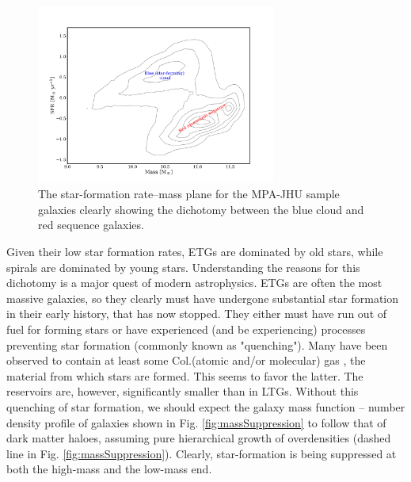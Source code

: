 	\begin{figure}
		\centering
		\includegraphics[width=0.7\textwidth]{introduction/sfMass.png}
		\caption[Star-formation rate--galaxy mass diagram]{The star-formation rate--mass plane for the MPA-JHU sample galaxies \citep{Kauffmann2003, Brinchmann2003, Salim2007} clearly showing the dichotomy between the blue cloud and red sequence galaxies.}
		\label{fig:colourMass}
	\end{figure}

	Given their low star formation rates, ETGs are dominated by old stars, while spirals are dominated by young stars. Understanding the reasons for this dichotomy is a major quest of modern astrophysics. ETGs are often the most massive galaxies, so they clearly must have undergone substantial star formation in their early history, that has now stopped. They either must have run out of fuel for forming stars or have experienced (and be experiencing) processes preventing star formation (commonly known as "quenching"). Many have been observed to contain at least some Col.(atomic and/or molecular) gas \citep[e.g.][]{Lees1991}, the material from which stars are formed. This seems to favor the latter. The reservoirs are, however, significantly smaller than in LTGs. Without this quenching of star formation, we should expect the galaxy mass function -- number density profile of galaxies shown in Fig. \ref{fig:massSuppression} to follow that of dark matter haloes, assuming pure hierarchical growth of overdensities (dashed line in Fig. \ref{fig:massSuppression}). Clearly, star-formation is being suppressed at both the high-mass and the low-mass end.

